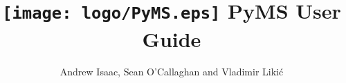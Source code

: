 \documentclass[hidelinks,twoside,a4paper]{book}
\begin{document}
\frontmatter

\title{\texttt{[image: logo/PyMS.eps]}
\Large{PyMS User Guide}}
\author{Andrew Isaac, Sean O'Callaghan and Vladimir Liki\'{c}\\
\medskip}

\medskip



\maketitle
\tableofcontents

\mainmatter
























\backmatter
\printindex
\end{document}
